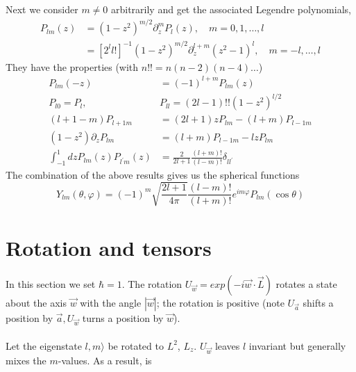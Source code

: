 Next we consider $m \neq 0$ arbitrarily and get the associated Legendre polynomials,
\begin{equation}
\begin{aligned} P_{l m}(z) &=\left(1-z^{2}\right)^{m / 2} \partial_{z}^{m} P_{l}(z), \quad m=0,1, \ldots, l \\ &=\left[2^{l} l !\right]^{-1}\left(1-z^{2}\right)^{m / 2} \partial_{z}^{l+m}\left(z^{2}-1\right)^{l}, \quad m=-l, \ldots, l \end{aligned}
\end{equation}
They have the properties (with $n !! = n (n - 2) (n - 4)\dots$)
\begin{equation}
\begin{aligned} P_{l m}(-z) &=(-1)^{l+m} P_{l m}(z) \\ P_{l 0}=P_{l}, & P_{l l}=(2 l-1) ! !\left(1-z^{2}\right)^{l / 2} \\(l+1-m) P_{l+1 m} &=(2 l+1) z P_{l m}-(l+m) P_{l-1 m} \\\left(1-z^{2}\right) \partial_{z} P_{l m} &=(l+m) P_{l-1 m}-l z P_{l m} \\ \int_{-1}^{1} d z P_{l m}(z) P_{l^{\prime} m}(z) &=\frac{2}{2 l+1} \frac{(l+m) !}{(l-m) !} \delta_{l l^{\prime}} \end{aligned}
\end{equation}
The combination of the above results gives us the spherical functions
\begin{equation}
    Y_{l m}(\theta, \varphi)=(-1)^{m} \sqrt{\frac{2 l+1}{4 \pi}} \frac{(l-m) !}{(l+m) !} e^{i m \varphi} P_{l m}(\cos \theta)
    \end{equation}

\section{Rotation and tensors}
In this section we set $\hbar= 1$. The rotation $U_{\vec{w}}=exp(-i\vec{w}\cdot\vec{L})$ rotates a state about the axis $\vec{w}$ with the angle $|\vec{w}|$; the rotation is positive (note $U_{\vec{a}}$ shifts a position by $\vec{a},U_{\vec{w}}$ turns a position by $\vec{w}$).\\\\
Let the eigenstate $l,m\rangle$ be rotated to $L^2$, $L_z$. $U_{\vec{w}}$ leaves $l$ invariant but generally mixes the $m$-values. As a result, is

